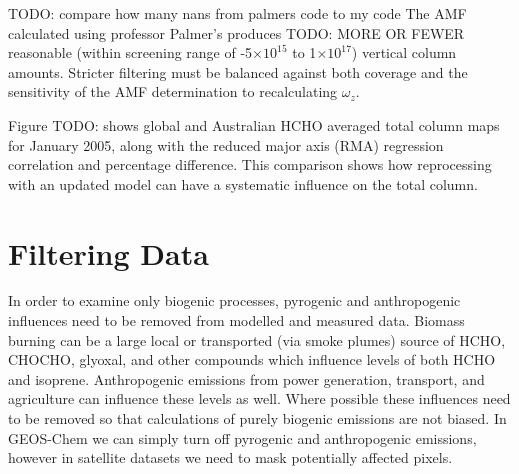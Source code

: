     
    TODO: compare how many nans from palmers code to my code
    The AMF calculated using professor Palmer's produces TODO: MORE OR FEWER reasonable (within screening range of -5$\times 10^{15}$ to 1$\times 10^{17}$) vertical column amounts.
    Stricter filtering must be balanced against both coverage and the sensitivity of the AMF determination to recalculating $\omega_z$.
  
    Figure TODO: shows global and Australian HCHO averaged total column maps for January 2005, along with the reduced major axis (RMA) regression correlation and percentage difference.
    This comparison shows how reprocessing with an updated model can have a systematic influence on the total column.
    
\section{Filtering Data}
  \label{Model:filter}
  
  
  
  
  In order to examine only biogenic processes, pyrogenic and anthropogenic influences need to be removed from modelled and measured data.
  Biomass burning can be a large local or transported (via smoke plumes) source of HCHO, CHOCHO, glyoxal, and other compounds which influence levels of both HCHO and isoprene.
  Anthropogenic emissions from power generation, transport, and agriculture can influence these levels as well.
  Where possible these influences need to be removed so that calculations of purely biogenic emissions are not biased. 
  In GEOS-Chem we can simply turn off pyrogenic and anthropogenic emissions, however in satellite datasets we need to mask potentially affected pixels.
  
